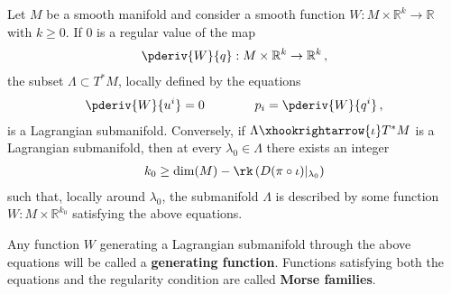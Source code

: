     \begin{theorem}\label{symplectic:maslow_hormander}
        Let $M$ be a smooth manifold and consider a smooth function $W:M\times\mathbb{R}^k\rightarrow\mathbb{R}$ with $k\geq 0$. If 0 is a regular value of the map
        \begin{gather}
            \pderiv{W}{q}:M\times\mathbb{R}^k\rightarrow\mathbb{R}^k\,,
        \end{gather}
        the subset $\Lambda\subset T^*M$, locally defined by the equations
        \begin{gather}
            \pderiv{W}{u^i} = 0 \qquad\qquad p_i=\pderiv{W}{q^i}\,,
        \end{gather}
        is a Lagrangian submanifold. Conversely, if $\Lambda\xhookrightarrow{\iota}T^*M$ is a Lagrangian submanifold, then at every $\lambda_0\in\Lambda$ there exists an integer
        \begin{gather}
            k_0\geq\dim(M) - \rk\left(D(\pi\circ\iota)|_{\lambda_0}\right)
        \end{gather}
        such that, locally around $\lambda_0$, the submanifold $\Lambda$ is described by some function $W:M\times\mathbb{R}^{k_0}$ satisfying the above equations.
    \end{theorem}
    Any function $W$ generating a Lagrangian submanifold through the above equations will be called a \textbf{generating function}. Functions satisfying both the equations and the regularity condition are called \textbf{Morse families}.


